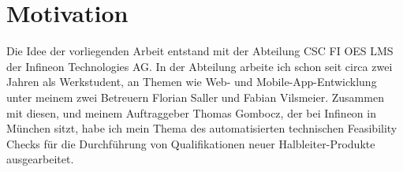 \section{Motivation}
Die Idee der vorliegenden Arbeit entstand mit der Abteilung CSC FI OES LMS der Infineon Technologies AG. 
In der Abteilung arbeite ich schon seit circa zwei Jahren als Werkstudent, an Themen wie Web- und Mobile-App-Entwicklung unter meinem zwei Betreuern Florian Saller und Fabian Vilsmeier.
Zusammen mit diesen, und meinem Auftraggeber Thomas Gombocz, der bei Infineon in München sitzt, habe ich mein Thema des automatisierten technischen Feasibility Checks für die Durchführung von Qualifikationen neuer Halbleiter-Produkte ausgearbeitet.
